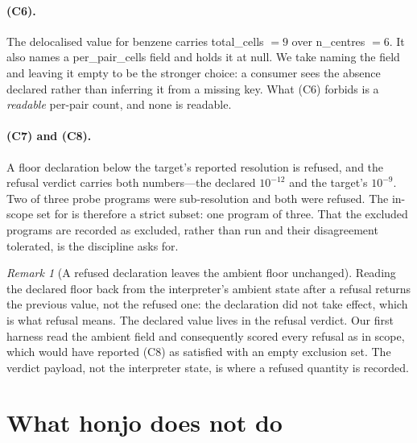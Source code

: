 \documentclass[11pt,twocolumn,a4paper]{article}
\theoremstyle{thmstyle}
\theoremstyle{definition}
\theoremstyle{remark}
\newtheorem{remark}[theorem]{Remark}
\begin{document}
\paragraph{(C6).} The delocalised value for benzene carries
\textsf{total\_cells} $=9$ over \textsf{n\_centres} $=6$. It also names
a \textsf{per\_pair\_cells} field and holds it at null. We take naming
the field and leaving it empty to be the stronger choice: a consumer
sees the absence declared rather than inferring it from a missing key.
What (C6) forbids is a \emph{readable} per-pair count, and none is
readable.

\paragraph{(C7) and (C8).} A floor declaration below the target's
reported resolution is refused, and the refusal verdict carries both
numbers---the declared $10^{-12}$ and the target's $10^{-9}$. Two of
three probe programs were sub-resolution and both were refused. The
in-scope set for  is therefore a strict subset:
one program of three. That the excluded programs are recorded as
excluded, rather than run and their disagreement tolerated, is the
discipline  asks for.

\begin{remark}[A refused declaration leaves the ambient floor unchanged]
\label{rem:ambient}
Reading the declared floor back from the interpreter's ambient state
after a refusal returns the previous value, not the refused one: the
declaration did not take effect, which is what refusal means. The
declared value lives in the refusal verdict. Our first harness read the
ambient field and consequently scored every refusal as in scope, which
would have reported (C8) as satisfied with an empty exclusion set. The
verdict payload, not the interpreter state, is where a refused quantity
is recorded.
\end{remark}



\section{What honjo does not do}
\label{sec:limits}
\end{document}
